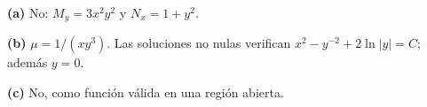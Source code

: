 \noindent\textbf{(a)} No: $M_y=3x^2y^2$ y $N_x=1+y^2$.

\noindent\textbf{(b)} $\mu=1/(xy^3)$. Las soluciones no nulas verifican $x^2-y^{-2}+2\ln|y|=C$; además $y=0$.

\noindent\textbf{(c)} No, como función válida en una región abierta.

